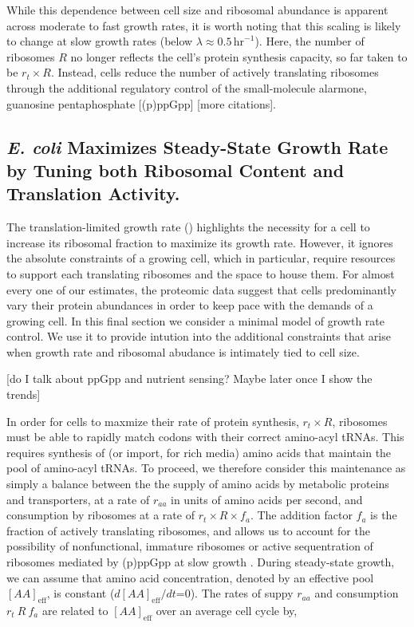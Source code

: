 While this dependence between cell size and ribosomal abundance is apparent
across moderate to fast growth rates, it is worth noting that this scaling is
likely to change at slow growth rates (below $\lambda \approx
0.5\,\text{hr}^{-1}$). Here, the number of ribosomes $R$ no longer reflects the
cell's protein synthesis capacity, so far taken to be $r_t
\times R$. Instead, cells reduce the number of actively translating
ribosomes through the additional regulatory control of the small-molecule
alarmone, guanosine pentaphosphate [(p)ppGpp] \citep{dai2016} [more citations].


\subsection{\textit{E. coli} Maximizes Steady-State Growth
Rate by Tuning both Ribosomal Content and Translation Activity.}

The translation-limited growth rate ()
highlights the necessity for a cell to increase its ribosomal fraction to
maximize its growth rate. However, it ignores the absolute constraints of a
growing cell, which in particular, require resources to support each translating
ribosomes and the space to house them. For almost every one of our estimates,
the proteomic data suggest that cells predominantly vary their protein
abundances in order to keep pace with the demands of a growing cell. In this
final section we consider a minimal model of growth rate control. We use it to
provide intution into the additional constraints that arise when growth rate and
ribosomal abudance is intimately tied to cell size.

[do I talk about ppGpp and nutrient sensing? Maybe later once I show the trends]

In order for cells to maxmize their rate of protein synthesis, $r_t \times R$,
ribosomes must be able to rapidly match codons with their correct amino-acyl
tRNAs. This requires synthesis of (or import, for rich media) amino acids that
maintain the pool of amino-acyl tRNAs. To proceed, we therefore consider this
maintenance as simply a balance between the the supply of amino acids by
metabolic proteins and transporters, at a rate of $r_{aa}$ in units of amino
acids per second, and consumption by ribosomes at a rate of $r_t \times R \times
f_a$. The addition factor $f_a$ is the fraction of actively translating
ribosomes, and allows us to account for the possibility of nonfunctional,
immature ribosomes or active sequentration of ribosomes mediated by (p)ppGpp at
slow growth \citep{dennis2004, dai2016}. During steady-state growth, we can
assume that amino acid concentration, denoted by an effective pool
$[AA]_{\text{eff}}$, is constant ($d[AA]_{\text{eff}}/dt$=0). The rates of suppy $r_{aa}$
and consumption $r_t \ R \ f_a$ are related to $[AA]_{\text{eff}}$ over an average cell cycle
by,

